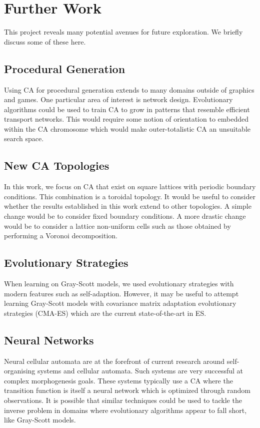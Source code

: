 \section{Further Work}

This project reveals many potential avenues for future exploration. We briefly discuss some of these here.

\subsection{Procedural Generation}

Using CA for procedural generation extends to many domains outside of graphics and games. One particular area of interest is network design. Evolutionary algorithms could be used to train CA to grow in patterns that resemble efficient transport networks. This would require some notion of orientation to embedded within the CA chromosome which would make outer-totalistic CA an unsuitable search space.

\subsection{New CA Topologies}

In this work, we focus on CA that exist on square lattices with periodic boundary conditions. This combination is a toroidal topology. It would be useful to consider whether the results established in this work extend to other topologies. A simple change would be to consider fixed boundary conditions. A more drastic change would be to consider a lattice non-uniform cells such as those obtained by performing a Voronoi decomposition.

\subsection{Evolutionary Strategies}

When learning on Gray-Scott models, we used evolutionary strategies with modern features such as self-adaption. However, it may be useful to attempt learning Gray-Scott models with covariance matrix adaptation evolutionary strategies (CMA-ES) which are the current state-of-the-art in ES.

\subsection{Neural Networks}

Neural cellular automata are at the forefront of current research around self-organising systems and cellular automata. Such systems are very successful at complex morphogenesis goals. These systems typically use a CA where the transition function is itself a neural network which is optimized through random observations. It is possible that similar techniques could be used to tackle the inverse problem in domains where evolutionary algorithms appear to fall short, like Gray-Scott models.

